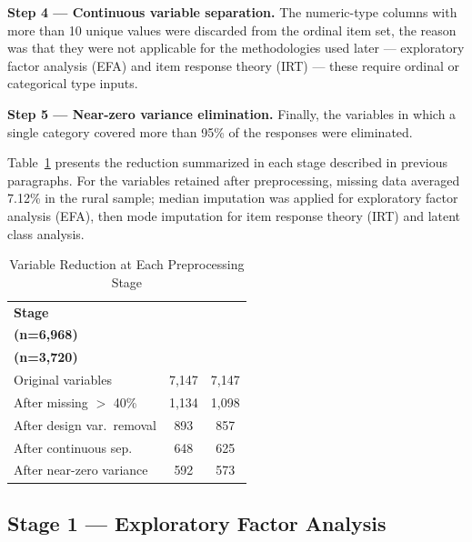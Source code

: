 \documentclass[runningheads]{llncs}
\begin{document}
\textbf{Step 4 --- Continuous variable separation.} The
numeric-type columns with more than 10 unique values were
discarded from the ordinal item set, the reason was that they
were not applicable for the methodologies used later ---
exploratory factor analysis (EFA) and item response theory
(IRT) --- these require ordinal or categorical type inputs.

\textbf{Step 5 --- Near-zero variance elimination.} Finally, the
variables in which a single category covered more than 95\% of
the responses were eliminated.

Table~\ref{tab:preprocessing} presents the reduction summarized
in each stage described in previous paragraphs. For the
variables retained after preprocessing, missing data averaged
7.12\% in the rural sample; median imputation was applied for
exploratory factor analysis (EFA), then mode imputation for item
response theory (IRT) and latent class analysis.

\begin{table}[!htbp]
\centering
\caption{Variable Reduction at Each Preprocessing Stage}
\label{tab:preprocessing}
\begin{tabular}{lcc}
\toprule
\textbf{Stage} &
  \makecell{\textbf{National} \\ \textbf{(n=6,968)}} &
  \makecell{\textbf{Rural} \\ \textbf{(n=3,720)}} \\
\midrule
Original variables         & 7,147 & 7,147 \\
After missing $>$ 40\%     & 1,134 & 1,098 \\
After design var.\ removal &   893 &   857 \\
After continuous sep.      &   648 &   625 \\
After near-zero variance   &   592 &   573 \\
\bottomrule
\end{tabular}
\end{table}

\subsection{Stage 1 --- Exploratory Factor Analysis}
\end{document}
